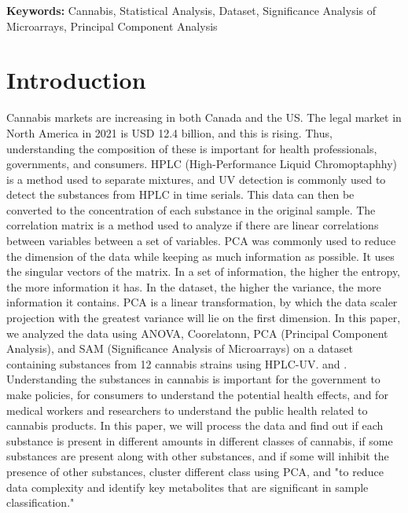 \documentclass{article}
\begin{document}
\textbf{Keywords: } Cannabis, Statistical Analysis, Dataset, Significance Analysis of Microarrays, Principal Component Analysis
\newpageye
\section{Introduction}
Cannabis markets are increasing \cite{Lab Manuel} in both Canada and the US. The legal market in North America in 2021 is USD 12.4 billion, and this is rising. \cite{Market} Thus, understanding the composition of these is important for health professionals, governments, and consumers. HPLC (High-Performance Liquid Chromoptaphhy) is a method used to separate mixtures, and UV detection is commonly used to detect the  substances from HPLC in time serials. This data can then be converted to the concentration of each substance in the original sample. The correlation matrix is a method used to analyze if there are linear correlations between variables between a set of variables. PCA was commonly used to reduce the dimension of the data while keeping as much information as possible. It uses the singular vectors of the matrix. \cite{PCA} In a set of information, the higher the entropy, the more information it has. \cite{info} In the dataset, the higher the variance, the more information it contains. PCA is a linear transformation, by which the data scaler projection with the greatest variance will lie on the first dimension. \cite{PCA} In this paper, we analyzed the data using ANOVA, Coorelatonn, PCA (Principal Component Analysis), and SAM (Significance Analysis of Microarrays) \cite{SAM} on a dataset containing substances from 12 cannabis strains using HPLC-UV. \cite{dataset1} and \cite{dataset2}. \\
Understanding the substances in cannabis is important for the government to make policies, for consumers to understand the potential health effects, and for medical workers and researchers to understand the public health related to cannabis products. In this paper, we will process the data and find out if each substance is present in different amounts in different classes of cannabis, if some substances are present along with other substances, and if some will inhibit the presence of other substances, cluster different class using PCA, and "to reduce data complexity and identify key metabolites that are significant in sample classification." \cite{Lab Manuel}



\end{document}
